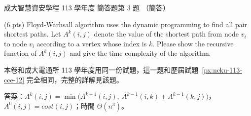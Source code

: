 \begin{pastexam}[label={px:ncku-113-isec-12}]{成大智慧資安學程 113 學年度 簡答題第 3 題}
（簡答）

(6 pts) Floyd-Warhsall algorithm uses the dynamic programming to find all pair shortest paths.
Let $A^k(i,j)$ denote the value of the shortest path from node $v_i$ to node $v_i$ according to
a vertex whose index is $k$. Please show the recursive function of $A^k(i,j)$ and give the time
complexity of the algorithm.
\end{pastexam}

\begin{pastsoln}
本卷和成大電通所 113 學年度用同一份試題，這一題和歷屆試題~\ref{px:ncku-113-cce-12} 完全相同，完整的詳解見該題。

答案：$A^k(i, j) = \min\bigl(A^{k-1}(i, j),\ A^{k-1}(i, k) + A^{k-1}(k, j)\bigr)$，$A^0(i, j) = \mathit{cost}(i, j)$；時間 $\Theta(n^3)$。
\end{pastsoln}
